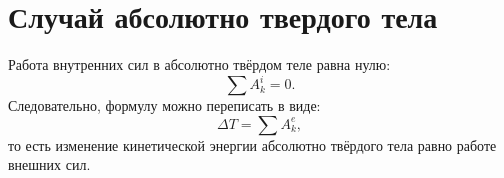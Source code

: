 \section{Случай абсолютно твердого тела}
Работа внутренних сил в абсолютно твёрдом теле равна нулю:
\[
	\sum A^i_k = 0.
\]
Следовательно, формулу можно переписать в виде:
\[
    \Delta T = \sum A^e_k,
\] 
то есть изменение кинетической энергии абсолютно твёрдого тела равно работе внешних сил.
\newpage
